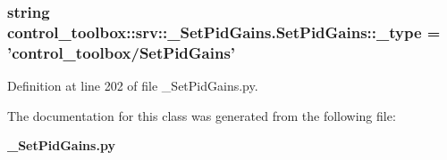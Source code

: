 \subsubsection[{\-\_\-type}]{\setlength{\rightskip}{0pt plus 5cm}string {\bf control\-\_\-toolbox\-::srv\-::\-\_\-\-Set\-Pid\-Gains.\-Set\-Pid\-Gains\-::\-\_\-type} = 'control\-\_\-toolbox/{\bf \-Set\-Pid\-Gains}'\hspace{0.3cm}{\ttfamily  [static, private]}}\label{classcontrol__toolbox_1_1srv_1_1__SetPidGains_1_1SetPidGains_aa23063c8349962a1cf34abbd33cf3936}


\-Definition at line 202 of file \-\_\-\-Set\-Pid\-Gains.\-py.



\-The documentation for this class was generated from the following file\-:\begin{DoxyCompactItemize}
\item 
{\bf \-\_\-\-Set\-Pid\-Gains.\-py}\end{DoxyCompactItemize}
